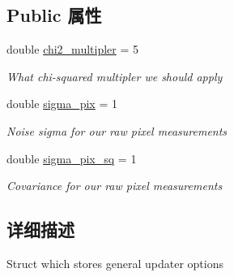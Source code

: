 \subsection*{Public 属性}
\begin{DoxyCompactItemize}
\item 
\mbox{\label{structov__msckf_1_1UpdaterOptions_a2358d5ab780a81a3486e7036ed38e2ec}} 
double \hyperlink{structov__msckf_1_1UpdaterOptions_a2358d5ab780a81a3486e7036ed38e2ec}{chi2\+\_\+multipler} = 5
\begin{DoxyCompactList}\small\item\em What chi-\/squared multipler we should apply \end{DoxyCompactList}\item 
\mbox{\label{structov__msckf_1_1UpdaterOptions_ab8e76b7991330d0c4632698b44ba4bbc}} 
double \hyperlink{structov__msckf_1_1UpdaterOptions_ab8e76b7991330d0c4632698b44ba4bbc}{sigma\+\_\+pix} = 1
\begin{DoxyCompactList}\small\item\em Noise sigma for our raw pixel measurements \end{DoxyCompactList}\item 
\mbox{\label{structov__msckf_1_1UpdaterOptions_a690671f9525d34e7058872f4f852fdad}} 
double \hyperlink{structov__msckf_1_1UpdaterOptions_a690671f9525d34e7058872f4f852fdad}{sigma\+\_\+pix\+\_\+sq} = 1
\begin{DoxyCompactList}\small\item\em Covariance for our raw pixel measurements \end{DoxyCompactList}\end{DoxyCompactItemize}


\subsection{详细描述}
Struct which stores general updater options 